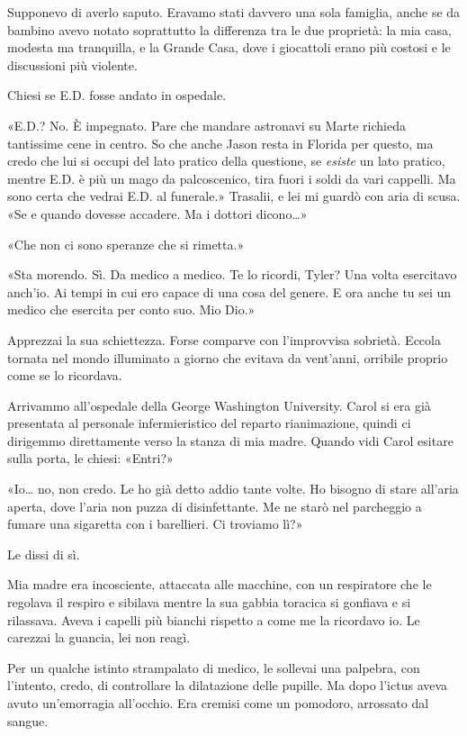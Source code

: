 Supponevo di averlo saputo. Eravamo stati davvero una sola famiglia,
anche se da bambino avevo notato soprattutto la differenza tra le due
proprietà: la mia casa, modesta ma tranquilla, e la Grande Casa, dove i
giocattoli erano più costosi e le discussioni più violente.

Chiesi se E.D. fosse andato in ospedale.

«E.D.? No. È impegnato. Pare che mandare astronavi su Marte richieda
tantissime cene in centro. So che anche Jason resta in Florida per
questo, ma credo che lui si occupi del lato pratico della questione, se
\emph{esiste} un lato pratico, mentre E.D. è più un mago da
palcoscenico, tira fuori i soldi da vari cappelli. Ma sono certa che
vedrai E.D. al funerale.» Trasalii, e lei mi guardò con aria di scusa.
«Se e quando dovesse accadere. Ma i dottori dicono\ldots»

«Che non ci sono speranze che si rimetta.»

«Sta morendo. Sì. Da medico a medico. Te lo ricordi, Tyler? Una volta
esercitavo anch'io. Ai tempi in cui ero capace di una cosa del genere. E
ora anche tu sei un medico che esercita per conto suo. Mio Dio.»

Apprezzai la sua schiettezza. Forse comparve con l'improvvisa sobrietà.
Eccola tornata nel mondo illuminato a giorno che evitava da vent'anni,
orribile proprio come se lo ricordava.

Arrivammo all'ospedale della George Washington University. Carol si era
già presentata al personale infermieristico del reparto rianimazione,
quindi ci dirigemmo direttamente verso la stanza di mia madre. Quando
vidi Carol esitare sulla porta, le chiesi: «Entri?»

«Io\ldots{} no, non credo. Le ho già detto addio tante volte. Ho bisogno
di stare all'aria aperta, dove l'aria non puzza di disinfettante. Me ne
starò nel parcheggio a fumare una sigaretta con i barellieri. Ci
troviamo lì?»

Le dissi di sì.

Mia madre era incosciente, attaccata alle macchine, con un respiratore
che le regolava il respiro e sibilava mentre la sua gabbia toracica si
gonfiava e si rilassava. Aveva i capelli più bianchi rispetto a come me
la ricordavo io. Le carezzai la guancia, lei non reagì.

Per un qualche istinto strampalato di medico, le sollevai una palpebra,
con l'intento, credo, di controllare la dilatazione delle pupille. Ma
dopo l'ictus aveva avuto un'emorragia all'occhio. Era cremisi come un
pomodoro, arrossato dal sangue.


